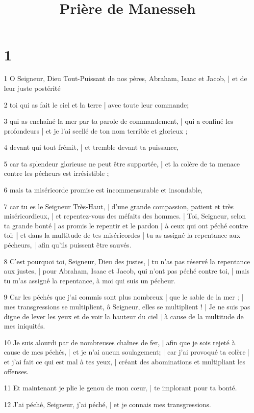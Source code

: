 

\title{Prière de Manesseh}

\chapter{1}

\par 1 O Seigneur, Dieu Tout-Puissant de nos pères, Abraham, Isaac et Jacob, | et de leur juste postérité
\par 2 toi qui as fait le ciel et la terre | avec toute leur commande;
\par 3 qui as enchaîné la mer par ta parole de commandement, | qui a confiné les profondeurs | et je l'ai scellé de ton nom terrible et glorieux ;
\par 4 devant qui tout frémit, | et tremble devant ta puissance,
\par 5 car ta splendeur glorieuse ne peut être supportée, | et la colère de ta menace contre les pécheurs est irrésistible ;
\par 6 mais ta miséricorde promise est incommensurable et insondable,
\par 7 car tu es le Seigneur Très-Haut, | d'une grande compassion, patient et très miséricordieux, | et repentez-vous des méfaits des hommes. | Toi, Seigneur, selon ta grande bonté | as promis le repentir et le pardon | à ceux qui ont péché contre toi; | et dans la multitude de tes miséricordes | tu as assigné la repentance aux pécheurs, | afin qu'ils puissent être sauvés.
\par 8 C'est pourquoi toi, Seigneur, Dieu des justes, | tu n'as pas réservé la repentance aux justes, | pour Abraham, Isaac et Jacob, qui n'ont pas péché contre toi, | mais tu m'as assigné la repentance, à moi qui suis un pécheur.
\par 9 Car les péchés que j'ai commis sont plus nombreux | que le sable de la mer ; | mes transgressions se multiplient, ô Seigneur, elles se multiplient ! | Je ne suis pas digne de lever les yeux et de voir la hauteur du ciel | à cause de la multitude de mes iniquités.
\par 10 Je suis alourdi par de nombreuses chaînes de fer, | afin que je sois rejeté à cause de mes péchés, | et je n'ai aucun soulagement; | car j'ai provoqué ta colère | et j'ai fait ce qui est mal à tes yeux, | créant des abominations et multipliant les offenses.
\par 11 Et maintenant je plie le genou de mon cœur, | te implorant pour ta bonté.
\par 12 J'ai péché, Seigneur, j'ai péché, | et je connais mes transgressions.
